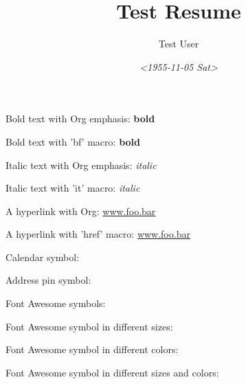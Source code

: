 \documentclass[10pt,letterpaper,ragged2e,withhyper]{awesome-cv}
\author{Test User}
\date{\textit{<1955-11-05 Sat>}}
\title{Test Resume}
\renewenvironment{itemize}{
  \begin{justify}
  \begin{olditemize}[leftmargin=2ex, nosep, noitemsep]
    \setlength{\parskip}{0pt}
    \renewcommand{\labelitemi}{\bullet}%
}{
  \end{olditemize}
  \end{justify}
}
\newcommand*{\addresssymbol}{{\color{color2}\small\faMapMarker}~}
\newcommand{\calendarsymbol}{{\color{color2}\small\faCalendar}~}
\begin{document}


\label{sec:orgbf9b619}


\label{sec:org08ca375}
\begin{itemize}
\item Bold text with Org emphasis: \textbf{bold}
\item Bold text with 'bf' macro: \textbf{bold}
\item Italic text with Org emphasis: \emph{italic}
\item Italic text with 'it' macro: \emph{italic}
\end{itemize}


\label{sec:org73ab6a2}
\begin{itemize}
\item A hyperlink with Org: \href{https://www.foo.bar}{www.foo.bar}
\item A hyperlink with 'href' macro: \href{https://www.foo.bar}{www.foo.bar}
\end{itemize}


\label{sec:org4f8c0b2}
\begin{itemize}
\item Calendar symbol: \calendarsymbol
\item Address pin symbol: \addresssymbol
\item Font Awesome symbols: {\faCogs} {\faGraduationCap} {\faGraduationCap} {\faBook} {\faWrench} {\faTrophy} {\faChalkboardTeacher} {\faUsers}
\item Font Awesome symbol in different sizes: {\Huge\faBriefcase} {\huge\faBriefcase} {\Large\faBriefcase} {\large\faBriefcase} {\normalsize\faBriefcase} {\small\faBriefcase} {\footnotesize\faBriefcase} {\scriptsize\faBriefcase} {\tiny\faBriefcase}
\item Font Awesome symbol in different colors: {\color{color1}\faBriefcase} {\color{black}\faBriefcase} {\color{darkgray}\faBriefcase} {\color{gray}\faBriefcase} {\color{lightgray}\faBriefcase} {\color{green}\faBriefcase} {\color{orange}\faBriefcase} {\color{purple}\faBriefcase} {\color{red}\faBriefcase} {\color{blue}\faBriefcase} {\color{awesome-emerald}\faBriefcase}
\item Font Awesome symbol in different sizes and colors: {\color{color1}\Huge\faBriefcase} {\color{awesome-emerald}\huge\faBriefcase} {\color{awesome-darknight}\Large\faBriefcase} {\color{awesome-skyblue}\large\faBriefcase} {\color{awesome-red}\normalsize\faBriefcase} {\color{awesome-pink}\small\faBriefcase} {\color{awesome-orange}\footnotesize\faBriefcase} {\color{awesome-nephritis}\scriptsize\faBriefcase} {\color{awesome-concrete}\tiny\faBriefcase}
\end{itemize}
\end{document}
